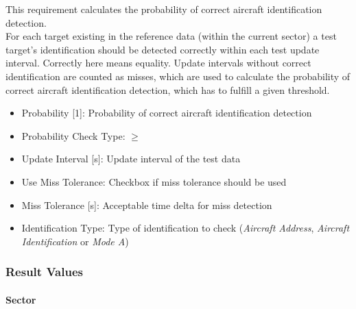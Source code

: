 This requirement calculates the probability of correct aircraft identification detection. \\

For each target existing in the reference data (within the current sector) a test target's identification should
be detected correctly within each test update interval. Correctly here means equality.
Update intervals without correct identification are counted as misses, which are used to calculate the probability of correct aircraft
identification detection, which has to fulfill a given threshold.

\begin{itemize}
    \item Probability [1]: Probability of correct aircraft identification detection
    \item Probability Check Type: $\geq$
    \item Update Interval [s]: Update interval of the test data
    \item Use Miss Tolerance: Checkbox if miss tolerance should be used
    \item Miss Tolerance [s]: Acceptable time delta for miss detection
    \item Identification Type: Type of identification to check (\textit{Aircraft Address}, \textit{Aircraft Identification} or \textit{Mode A})
\end{itemize}

\subsubsection{Result Values}

\paragraph{Sector}

